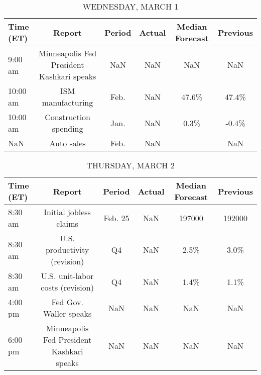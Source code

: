 \documentclass{article}%
\begin{document}
%


\begin{table}[htbp]%
\caption{WEDNESDAY, MARCH 1}%
\centering%
\begin{adjustbox}{width=1\textwidth}%
\begin{tabular}{lccccc}
\toprule
Time (ET) &                                    Report & Period & Actual & Median Forecast & Previous \\
\midrule
  9:00 am & Minneapolis Fed President Kashkari speaks &    NaN &    NaN &             NaN &      NaN \\
 10:00 am &                         ISM manufacturing &   Feb. &    NaN &           47.6\% &    47.4\% \\
 10:00 am &                     Construction spending &   Jan. &    NaN &            0.3\% &    -0.4\% \\
      NaN &                                Auto sales &   Feb. &    NaN &              -- &      NaN \\
\bottomrule
\end{tabular}
%
\end{adjustbox}%
\end{table}

%


\begin{table}[htbp]%
\caption{THURSDAY, MARCH 2}%
\centering%
\begin{adjustbox}{width=1\textwidth}%
\begin{tabular}{lccccc}
\toprule
Time (ET) &                                    Report &  Period & Actual & Median Forecast & Previous \\
\midrule
  8:30 am &                    Initial jobless claims & Feb. 25 &    NaN &          197000 &   192000 \\
  8:30 am &              U.S. productivity (revision) &      Q4 &    NaN &            2.5\% &     3.0\% \\
  8:30 am &          U.S. unit-labor costs (revision) &      Q4 &    NaN &            1.4\% &     1.1\% \\
  4:00 pm &                    Fed Gov. Waller speaks &     NaN &    NaN &             NaN &      NaN \\
  6:00 pm & Minneapolis Fed President Kashkari speaks &     NaN &    NaN &             NaN &      NaN \\
\bottomrule
\end{tabular}
%
\end{adjustbox}%
\end{table}
\end{document}
